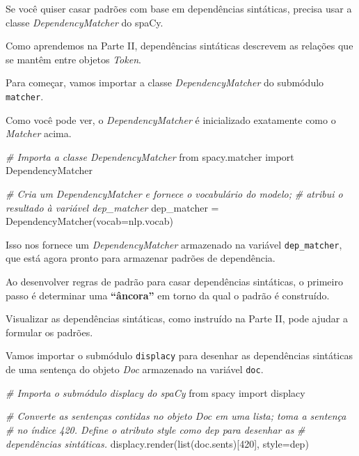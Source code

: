 \documentclass[
  brazilian,
]{article}
\newenvironment{Shaded}{}{}
\newcommand{\BuiltInTok}[1]{#1}
\newcommand{\CommentTok}[1]{\textcolor[rgb]{0.38,0.63,0.69}{\textit{#1}}}
\newcommand{\DecValTok}[1]{\textcolor[rgb]{0.25,0.63,0.44}{#1}}
\newcommand{\ImportTok}[1]{#1}
\newcommand{\NormalTok}[1]{#1}
\newcommand{\OperatorTok}[1]{\textcolor[rgb]{0.40,0.40,0.40}{#1}}
\newcommand{\StringTok}[1]{\textcolor[rgb]{0.25,0.44,0.63}{#1}}
\begin{document}
Se você quiser casar padrões com base em dependências sintáticas,
precisa usar a classe \emph{DependencyMatcher} do spaCy.

Como aprendemos na Parte II, dependências sintáticas descrevem as
relações que se mantêm entre objetos \emph{Token}.

Para começar, vamos importar a classe \emph{DependencyMatcher} do
submódulo \texttt{matcher}.

Como você pode ver, o \emph{DependencyMatcher} é inicializado exatamente
como o \emph{Matcher} acima.

\begin{Shaded}
\begin{Highlighting}[]
\CommentTok{\# Importa a classe DependencyMatcher}
\ImportTok{from}\NormalTok{ spacy.matcher }\ImportTok{import}\NormalTok{ DependencyMatcher}

\CommentTok{\# Cria um DependencyMatcher e fornece o vocabulário do modelo;}
\CommentTok{\# atribui o resultado à variável \textquotesingle{}dep\_matcher\textquotesingle{}}
\NormalTok{dep\_matcher }\OperatorTok{=}\NormalTok{ DependencyMatcher(vocab}\OperatorTok{=}\NormalTok{nlp.vocab)}
\end{Highlighting}
\end{Shaded}

Isso nos fornece um \emph{DependencyMatcher} armazenado na variável
\texttt{dep\_matcher}, que está agora pronto para armazenar padrões de
dependência.

Ao desenvolver regras de padrão para casar dependências sintáticas, o
primeiro passo é determinar uma \textbf{``âncora''} em torno da qual o
padrão é construído.

Visualizar as dependências sintáticas, como instruído na Parte II, pode
ajudar a formular os padrões.

Vamos importar o submódulo \texttt{displacy} para desenhar as
dependências sintáticas de uma sentença do objeto \emph{Doc} armazenado
na variável \texttt{doc}.

\begin{Shaded}
\begin{Highlighting}[]
\CommentTok{\# Importa o submódulo displacy do spaCy}
\ImportTok{from}\NormalTok{ spacy }\ImportTok{import}\NormalTok{ displacy}

\CommentTok{\# Converte as sentenças contidas no objeto Doc em uma lista; toma a sentença}
\CommentTok{\# no índice 420. Define o atributo \textquotesingle{}style\textquotesingle{} como \textquotesingle{}dep\textquotesingle{} para desenhar as}
\CommentTok{\# dependências sintáticas.}
\NormalTok{displacy.render(}\BuiltInTok{list}\NormalTok{(doc.sents)[}\DecValTok{420}\NormalTok{], style}\OperatorTok{=}\StringTok{\textquotesingle{}dep\textquotesingle{}}\NormalTok{)}
\end{Highlighting}
\end{Shaded}
\end{document}
